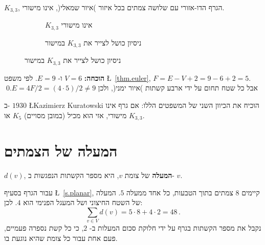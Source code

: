 \begin{theorem}
$K_{3,3}$,
הגרף הדו-אזורי עם שלושה צמתים בכל איזור )איור שמאלי(,
אינו מישורי.
\end{theorem}

\begin{figure}[htb]
\begin{center}
\begin{subfigure}{.4\textwidth}
\caption{$K_{3,3}$ אינו מישורי}\label{f.five-k33}
\end{subfigure}
\hspace{3em}
\begin{subfigure}{.4\textwidth}
\caption{ניסיון כושל לצייר את
$K_{3,3}$
במישור}
\label{f.five-k33-failed}
\end{subfigure}
\end{center}
\end{figure}

\textbf{הוכחה:}
$V=6$
ו-%
$E=9$.
לפי משפט
\L{~\ref{thm.euler}},
$F=E-V+2=9-6+2=5$.
אבל כל שטח תחום על ידי ארבע קשתות )איור ימני(, ולכן
$E=4F/2=(4\cdot 5)/2\neq 9$.\qed

ב-%
$1930$
\L{Kazimierz Kuratowski}
הוכיח את הכיוון השני של המשפטים הללו: אם גרף אינו מישורי, אזי הוא מכיל (במובן מסויים) 
$K_5$
או
$K_{3,3}$.


\section{המעלה של הצמתים}\label{s.degrees}

\begin{definition}
$d(v)$,
\textbf{המעלה}
של צומת
$v$,
היא מספר הקשתות הנפגשות ב-%
$v$.
\end{definition}

\begin{example}
עבור הגרף בסעיף
\L{~\ref{s.planar}},
קיימים 
$8$
צמתים בתוך הטבעות, כל אחד ממעלה
$5$.
המעלה של השטח החיצוני ושל המעגל הפנימי הוא 
$4$.
לכן:
\[
\sum_{v\in V} d(v) = 5\cdot 8 + 4\cdot 2=48\,.
\]
נקבל את מספר הקשתות בגרף על ידי חלוקת סכום המעלות ב-%
$2$,
כי כל קשת נספרה פעמיים, פעם אחת עבור כל צומת שהיא נוגעת בו.
\end{example}

